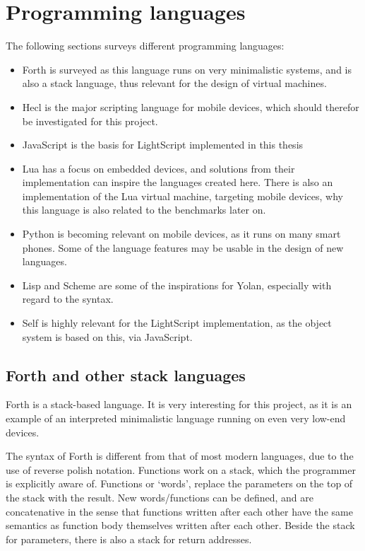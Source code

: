 \documentclass[11pt]{report}
\begin{document}
\section{Programming languages}
The following sections surveys different programming languages:
\begin{itemize}
\item Forth is surveyed as this language runs on very minimalistic systems, and is also a stack language, thus relevant for the design of virtual machines. 
\item Hecl is the major scripting language for mobile devices, which should therefor be investigated for this project.
\item JavaScript is the basis for LightScript implemented in this thesis
\item Lua has a focus on embedded devices, and solutions from their implementation can inspire the languages created here. There is also an implementation of the Lua virtual machine, targeting mobile devices, why this language is also related to the benchmarks later on.
\item Python is becoming relevant on mobile devices, as it runs on many smart phones. Some of the language features may be usable in the design of new languages.
\item Lisp and Scheme are some of the inspirations for Yolan, especially with regard to the syntax. 
\item Self is highly relevant for the LightScript implementation, as the object system is based on this, via JavaScript.
\end{itemize}


\subsection{Forth and other stack languages}
Forth is a stack-based language.
It is very interesting for this project, as it is an example of an interpreted minimalistic language running on even very low-end devices.

The syntax of Forth is different from that of most modern languages, due to the use of reverse polish notation.
Functions work on a stack, which the programmer is explicitly aware of. 
Functions or `words', replace the parameters on the top of the stack with the result. 
New words/functions can be defined, and are concatenative in the sense that functions written after each other have the same semantics as function body themselves written after each other.
Beside the stack for parameters, there is also a stack for return addresses.
\end{document}
